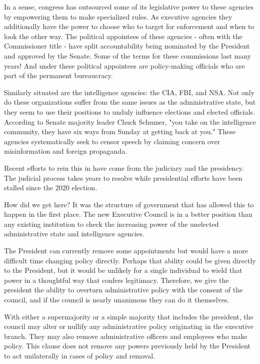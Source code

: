 \documentclass{article}
\begin{document}
In a sense, congress has outsourced some of its legislative power to these agencies by empowering them to make specialized rules. As executive agencies they additionally have the power to choose who to target for enforcement and when to look the other way. The political appointees of these agencies - often with the Commissioner title - have split accountability being nominated by the President and approved by the Senate. Some of the terms for these commissions last many years! And under these political appointees are policy-making officials who are part of the permanent bureaucracy.

Similarly situated are the intelligence agencies: the CIA, FBI, and NSA. Not only do these organizations suffer from the same issues as the administrative state, but they seem to use their positions to unduly influence elections and elected officials. According to Senate majority leader Chuck Schumer\cite{Stanley}, "you take on the intelligence community, they have six ways from Sunday at getting back at you." These agencies systematically seek to censor speech by claiming concern over misinformation and foreign propaganda\cite{Beanz}.

Recent efforts to rein this in have come from the judiciary\cite{Crowell} and the presidency\cite{ScheduleF}. The judicial process takes years to resolve while presidential efforts have been stalled since the 2020 election.

How did we get here? It was the structure of government that has allowed this to happen in the first place. The new Executive Council is in a better position than any existing institution to check the increasing power of the unelected administrative state and intelligence agencies.

The President can currently remove some appointments but would have a more difficult time changing policy directly\cite{Fairlie}. Perhaps that ability could be given directly to the President, but it would be unlikely for a single individual to wield that power in a thoughtful way that confers legitimacy. Therefore, we give the president the ability to overturn administrative policy with the consent of the council, and if the council is nearly unanimous they can do it themselves.

\begin{quoting}
With either a supermajority or a simple majority that includes the president, the council may alter or nullify any administrative policy originating in the executive branch. They may also remove administrative officers and employees who make policy. This clause does not remove any powers previously held by the President to act unilaterally in cases of policy and removal.
\end{quoting}
\end{document}
